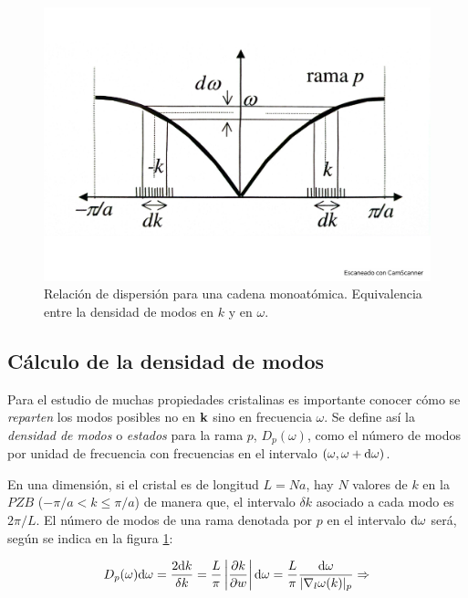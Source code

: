 \begin{figure}[h!] \centering
    \includegraphics[scale=0.36]{Cuerpo/Ch_05/Fotos libro 1.pdf}
    \caption{Relación de dispersión para una cadena monoatómica. Equivalencia entre la densidad de modos en $k$ y en $\omega$.}
    \label{Fig:05-01}
\end{figure}    


\subsection{Cálculo de la densidad de modos}

Para el estudio de muchas propiedades cristalinas es importante conocer cómo se \textit{reparten} los modos posibles no en $\mathbf{k}$ sino en frecuencia $\omega$. Se define así la \textit{densidad de modos} o \textit{estados} para la rama $p$, $D_p (\omega)$, como el número de modos por unidad de frecuencia con frecuencias en el intervalo $(\omega,\omega+\mathrm{d} \omega)$.

En una dimensión, si el cristal es de longitud $L=Na$, hay $N$ valores de $k$ en la $PZB$ ($-\pi/a < k\leq \pi/a$) de manera que, el intervalo $\delta k$ asociado a cada modo es $2 \pi / L$. El número de modos de una rama denotada por $p$ en el intervalo $\mathrm{d} \omega$ será, según se indica en la figura \ref{Fig:05-01}:

\begin{eqnarray*}
	D_p (\omega) \mathrm{d} \omega = \frac{2 \mathrm{d} k}{\delta k} = \frac{L}{\pi} \left| \frac{\partial k}{\partial w}  \right| \mathrm{d} \omega = \frac{L}{\pi} \frac{\mathrm{d} \omega}{|\nabla_l \omega (k)|_p} \Rightarrow
\end{eqnarray*} 

